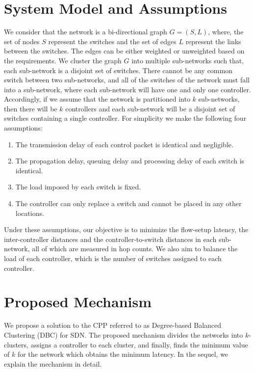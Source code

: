 \documentclass{IEEEtran}
\begin{document}
	
	
	\section{System Model and Assumptions} \label{sysMod}
	
	We consider that the network is a bi-directional graph $G=(S, L)$, where, the set of nodes $S$ represent the switches and the set of edges $L$ represent the links between the switches. The edges can be either weighted or unweighted based on the requirements. We cluster the graph $G$ into multiple sub-networks such that, each sub-network is a disjoint set of switches. There cannot be any common switch between two sub-networks, and all of the switches of the network must fall into a sub-network, where each sub-network will have one and only one controller. Accordingly, if we assume that the network is partitioned into $k$ sub-networks, then there will be $k$ controllers and each sub-network will be a disjoint set of switches containing a single controller. For simplicity we make the following four assumptions:
	\begin{enumerate}
		\item The transmission delay of each control packet is identical and negligible.
		\item The propagation delay, queuing delay and processing delay of each switch is identical.
		\item The load imposed by each switch is fixed.
		\item The controller can only replace a switch and cannot be placed in any other locations.
	\end{enumerate}
	Under these assumptions, our objective is to minimize the flow-setup latency, the inter-controller distances and the controller-to-switch distances in each sub-network, all of which are measured in hop counts. We also aim to balance the load of each controller, which is the number of switches assigned to each controller.
	
	\section{Proposed Mechanism} \label{proposedalgo}
	
	We propose a solution to the CPP referred to as Degree-based Balanced Clustering (DBC) for SDN. The proposed mechanism divides the networks into $k$-clusters, assigns a controller to each cluster, and finally, finds the minimum value of $k$ for the network which obtains the minimum latency. In the sequel, we explain the mechanism in detail.
	
\end{document}

